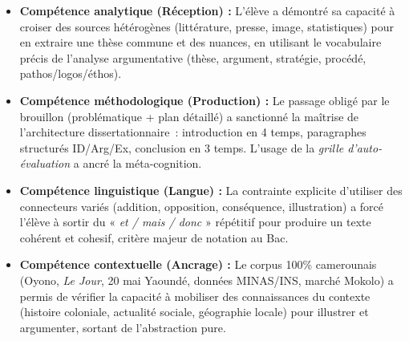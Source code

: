 \documentclass[11pt]{article}
\newcommand{\cle}[1]{{\popxbold\color{popdark}#1}}
\begin{document}
\begin{aretenir}
\begin{itemize}
    \item \textbf{Compétence analytique (Réception) :} L'élève a démontré sa capacité à croiser des sources hétérogènes (littérature, presse, image, statistiques) pour en extraire une thèse commune et des nuances, en utilisant le vocabulaire précis de l'analyse argumentative (\cle{thèse}, \cle{argument}, \cle{stratégie}, \cle{procédé}, \cle{pathos/logos/éthos}).
    \item \textbf{Compétence méthodologique (Production) :} Le passage obligé par le brouillon (problématique + plan détaillé) a sanctionné la maîtrise de l'architecture dissertationnaire~: introduction en 4 temps, paragraphes structurés ID/Arg/Ex, conclusion en 3 temps. L'usage de la \emph{grille d'auto-évaluation} a ancré la méta-cognition.
    \item \textbf{Compétence linguistique (Langue) :} La contrainte explicite d'utiliser des connecteurs variés (addition, opposition, conséquence, illustration) a forcé l'élève à sortir du « \emph{et / mais / donc } » répétitif pour produire un texte \cle{cohérent} et \cle{cohesif}, critère majeur de notation au Bac.
    \item \textbf{Compétence contextuelle (Ancrage) :} Le corpus 100\% camerounais (Oyono, \emph{Le Jour}, 20 mai Yaoundé, données MINAS/INS, marché Mokolo) a permis de vérifier la capacité à mobiliser des \cle{connaissances du contexte} (histoire coloniale, actualité sociale, géographie locale) pour illustrer et argumenter, sortant de l'abstraction pure.
\end{itemize}
\end{aretenir}
\end{document}
